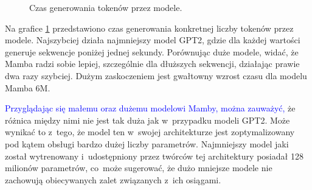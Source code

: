 \documentclass[data-science]{agh-wi} %
\begin{document}
\begin{figure}
    \centering
    \caption{Czas generowania tokenów przez modele.}\label{fig:time_generate}
\end{figure}

Na grafice \ref*{fig:time_generate} przedstawiono czas generowania konkretnej liczby tokenów przez modele. Najszybciej działa najmniejszy model GPT2, gdzie dla każdej wartości generuje sekwencje poniżej jednej sekundy. Porównując duże modele, widać, że Mamba radzi sobie lepiej, szczególnie dla dłuższych sekwencji, działając prawie dwa razy szybciej. Dużym zaskoczeniem jest gwałtowny wzrost czasu dla modelu Mamba 6M.

\textcolor{blue}{Przyglądając się małemu oraz dużemu modelowi Mamby, można zauważyć, }że różnica między nimi nie jest tak duża jak w~przypadku modeli GPT2. Może wynikać to z~tego, że model ten w~swojej architekturze jest zoptymalizowany pod kątem obsługi bardzo dużej liczby parametrów. Najmniejszy model jaki został wytrenowany i~udostępniony przez twórców tej architektury posiadał 128 milionów parametrów, co~może sugerować, że dużo mniejsze modele nie zachowują obiecywanych zalet związanych z~ich osiągami.
\end{document}

